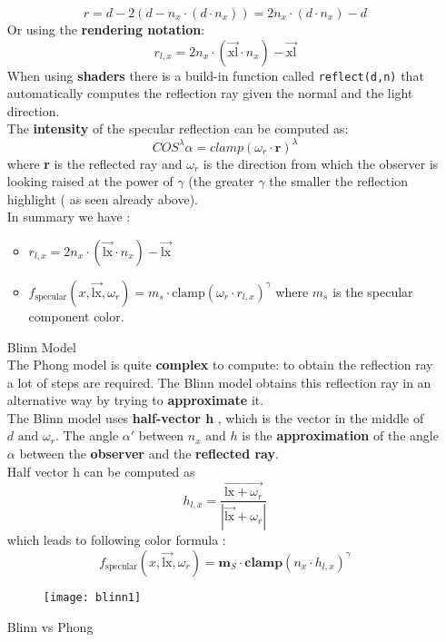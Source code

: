 \begin{itemize}
\[
\boxed{r = d-2(d-n_x \cdot (d \cdot n_x)) = 2n_x \cdot (d \cdot n_x)-d}
\]
Or using the \textbf{rendering notation}:
\[
\boxed{r_{l,x}= 2n_x\cdot (\overrightarrow{\text{xl}} \cdot n_x) - \overrightarrow{\text{xl}}}
\]
When using \textbf{shaders} there is a build-in function called \texttt{reflect(d,n)} that automatically computes the reflection ray given the normal and the light direction.\\
The \textbf{intensity} of the specular reflection can be computed as:
\[
\boxed{COS^{\lambda}\alpha =clamp(\omega_r \cdot \textbf{r})^{\lambda} }
\]
where \textbf{r} is the reflected ray and $\omega_r$ is the direction from which the observer is looking raised at the power of $\gamma$ (the greater $\gamma$  the smaller the reflection highlight ( as seen already above).\\
In summary we  have :
\begin{itemize}
\item $r_{l,x}= 2n_x \cdot (\overrightarrow{\text{lx}} \cdot n_x) - \overrightarrow{\text{lx}}$
\item $f_{\text{specular}}(x, \overrightarrow{\text{lx}},\omega_r) = m_s \cdot \text{clamp}(\omega_r \cdot r_{l,x})^{\gamma}$
where $m_s$ is the specular component color.
\end{itemize}
\item[Blinn Model]\hfill\\
The Phong model is quite \textbf{complex} to compute: to obtain the reflection ray a lot of steps are required. The Blinn model obtains this reflection ray in an alternative way by trying to \textbf{approximate} it. \\
The Blinn model uses \textbf{half-vector h } , which is the vector in the middle of $ d \text{ and } \omega_r$. The angle $\alpha'$ between $n_x \text{ and } h$ is the \textbf{approximation} of the angle $\alpha$ between the \textbf{observer} and the \textbf{reflected ray}.\\
Half vector h can be computed as $$ h_{l,x} = \frac{\overrightarrow{\text{lx}+\omega_r}}{|\overrightarrow{\text{lx}} + \omega_r|} $$ which leads to following color formula :
\[
\boxed{f_{\text{specular}}(x,\overrightarrow{\text{lx}},\omega_r)= \textbf{m}_S \cdot \textbf{clamp}(n_x \cdot h_{l,x})^{\gamma}}
\]
\begin{figure}[H]
  \centering
  \texttt{[image: blinn1]}
\end{figure}
\item[Blinn vs Phong]\hfill\\

\end{itemize}

